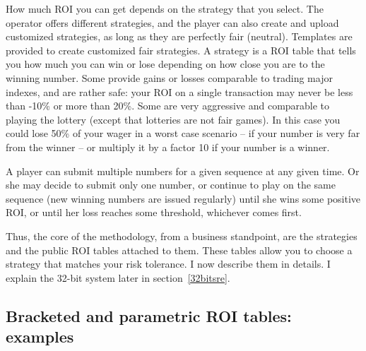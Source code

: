 \documentclass[oneside,10pt]{book}
\begin{document}
How much ROI you can get depends on the strategy that you select. The operator offers different strategies, and the player can  also create and upload customized strategies, as long as they are perfectly fair (neutral). Templates are provided to create customized fair strategies.  A strategy is a ROI table that tells you how much you can win or lose depending on how close you are to the winning number. Some provide gains or losses comparable to trading major indexes, and are rather safe: your ROI on a single transaction may never be less than -10\% or more than 20\%. Some are very aggressive and comparable to playing the lottery (except that lotteries are not fair games). In this case you could lose 50\% of your wager in a worst case scenario -- if your number is very far from the winner -- or multiply it by a factor 10 if your number is a winner. 

A player can submit multiple numbers for a given sequence at any given time. Or she may decide to submit only one number, or continue to play on the same sequence (new winning numbers are issued regularly) until she wins some positive ROI, or until her loss reaches some threshold, whichever comes first. 

Thus, the core of the methodology, from a business standpoint, are the strategies and the public ROI tables attached to them. These tables allow you to choose a strategy that matches your risk tolerance. I now describe them in details. I
explain the 32-bit system later in section~\ref{32bitsre}.

\subsection{Bracketed and parametric ROI tables: examples}
\end{document}
